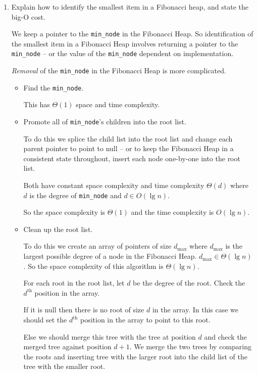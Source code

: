 \documentclass[10pt,\jkfside,a4paper]{article}
\begin{document}
\begin{enumerate}
\item Explain how to identify the smallest item in a Fibonacci heap, and state the big-O cost.

We keep a pointer to the {\tt min\_node} in the Fibonacci Heap. So identification of the 
smallest item in a Fibonacci Heap involves returning a pointer to the {\tt min\_node} -- or 
the value of the {\tt min\_node} dependent on implementation.

\textit{Removal} of the {\tt min\_node} in the Fibonacci Heap is more complicated.

\begin{itemize}

\item Find the {\tt min\_node}. 

This has $\Theta(1)$ space and time complexity.

\item Promote all of {\tt min\_node}'s children into the root list. 

To do this we splice the child list into the root list and change each parent pointer 
to point to null -- or to keep the Fibonacci Heap in a consistent state throughout, insert 
each node one-by-one into the root list.

Both have constant space complexity and 
time complexity $\Theta(d)$ where $d$ is the degree of {\tt min\_node} and $d \in O(\lg n)$.

So the space complexity is $\Theta(1)$ and the time complexity is $O(\lg n)$.

\item Clean up the root list. 

To do this we create an array of pointers of size $d_{\text{max}}$ where $d_{\text{max}}$ is the largest 
possible degree of a node in the Fibonacci Heap. $d_{\text{max}} \in \Theta(\lg n)$. So the space 
complexity of this algorithm is $\Theta(\lg n)$.

For each root in the root list, let $d$ be the degree of the root. Check the $d^\text{th}$ position 
in the array. 

If it is null then there is no root of size $d$ in the array. In this case we should 
set the $d^\text{th}$ position in the array to point to this root. 

Else we should merge this tree with the tree at position $d$ and check the merged tree against position $d + 1$.
We merge the two trees by comparing the roots and inserting tree with the larger root into the child 
list of the tree with the smaller root.


\end{itemize}
\end{enumerate}
\end{document}
